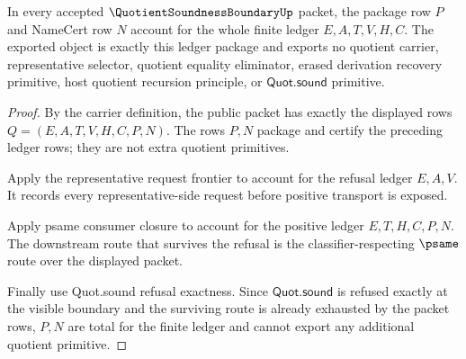 \begin{theorem}
\label{thm:quotient-soundness-boundary-pkg-namecert-ledger-totality}
In every accepted $\QuotientSoundnessBoundaryUp$ packet, the package row $P$ and NameCert row $N$ account for the whole finite ledger $E,A,T,V,H,C$. The exported object is exactly this ledger package and exports no quotient carrier, representative selector, quotient equality eliminator, erased derivation recovery primitive, host quotient recursion principle, or $\mathsf{Quot.sound}$ primitive.
\end{theorem}
\begin{proof}
By the carrier definition, the public packet has exactly the displayed rows $Q=(E,A,T,V,H,C,P,N)$. The rows $P,N$ package and certify the preceding ledger rows; they are not extra quotient primitives.

Apply the representative request frontier to account for the refusal ledger $E,A,V$. It records every representative-side request before positive transport is exposed.

Apply psame consumer closure to account for the positive ledger $E,T,H,C,P,N$. The downstream route that survives the refusal is the classifier-respecting $\psame$ route over the displayed packet.

Finally use Quot.sound refusal exactness. Since $\mathsf{Quot.sound}$ is refused exactly at the visible boundary and the surviving route is already exhausted by the packet rows, $P,N$ are total for the finite ledger and cannot export any additional quotient primitive.
\end{proof}

